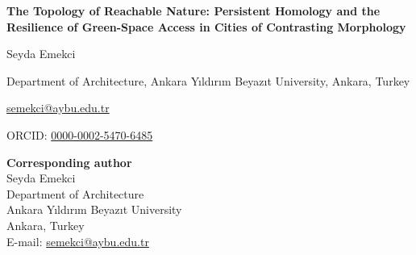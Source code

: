 \documentclass[12pt]{article}
\begin{document}
\begin{center}
{\Large\bfseries The Topology of Reachable Nature: Persistent Homology and the
Resilience of Green-Space Access in Cities of Contrasting Morphology\par}
\end{center}

\vspace{2\baselineskip}

\begin{center}
{\large Seyda Emekci\par}
\vspace{0.5\baselineskip}
Department of Architecture, Ankara Y{\i}ld{\i}r{\i}m Beyaz{\i}t University,
Ankara, Turkey\par
\href{mailto:semekci@aybu.edu.tr}{semekci@aybu.edu.tr}\par
ORCID: \href{https://orcid.org/0000-0002-5470-6485}{0000-0002-5470-6485}\par
\end{center}

\vfill

\textbf{Corresponding author}\\[0.3\baselineskip]
Seyda Emekci\\
Department of Architecture\\
Ankara Y{\i}ld{\i}r{\i}m Beyaz{\i}t University\\
Ankara, Turkey\\
E-mail: \href{mailto:semekci@aybu.edu.tr}{semekci@aybu.edu.tr}
\end{document}
